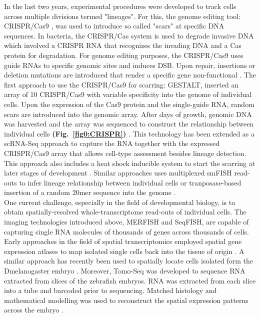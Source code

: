 In the last two years, experimental procedures were developed to track cells across multiple divisions termed "lineages". For this, the genome editing tool: \gls{CRISPR}/\gls{Cas9} \citep{Jinek2012}, was used to introduce so called "scars" at specific DNA sequences. In bacteria, the CRISPR/Cas system is used to degrade invasive DNA which involved a CRISPR RNA that recognizes the invading DNA and a Cas protein for degradation. For genome editing purposes, the \gls{CRISPR}/\gls{Cas9} uses guide RNAs to specific genomic sites and induces \gls{DSB}. Upon repair, insertions or deletion mutations are introduced that render a specific gene non-functional \citep{Zhang2014c}. The first approach to use the 	\gls{CRISPR}/\gls{Cas9} for scarring: \gls{GESTALT}, inserted an array of 10 \gls{CRISPR}/\gls{Cas9} with variable specificity into the genome of individual cells. Upon the expression of the Cas9 protein and the single-guide RNA, random scars are introduced into the genomic array. After days of growth, genomic DNA was harvested and the array was sequenced to construct the relationship between individual cells \textbf{(Fig.~\ref{fig0:CRISPR})} \citep{McKenna2016}. This technology has been extended as a scRNA-Seq approach to capture the RNA together with the expressed \gls{CRISPR}/\gls{Cas9} array that allows cell-type assessment besides lineage detection. This approach also includes a heat shock inducible system to start the scarring at later stages of development \citep{Raj2018}. Similar approaches uses multiplexed smFISH read-outs to infer lineage relationship between individual cells \citep{Frieda2017} or tranposase-based insertion of a random 20mer sequence into the genome \citep{Wagner2018}.\\

One current challenge, especially in the field of developmental biology, is to obtain spatially-resolved whole-transcriptome read-outs of individual cells. The imaging technologies introduced above, MERFISH and SeqFISH, are capable of capturing single RNA molecules of thousands of genes across thousands of cells. Early approaches in the field of spatial transcriptomics employed spatial gene expression atlases to map isolated single cells back into the tissue of origin \citep{Achim2015, Satija2015a}. A similar approach has recently been used to spatially locate cells isolated form the \gls{Dmelanogaster} embryo \citep{Karaiskos2017}. Moreover, Tomo-Seq was developed to sequence RNA extracted from slices of the zebrafish embryos. RNA was extracted from each slice into a tube and barcoded prior to sequencing. Matched histology and mathematical modelling was used to reconstruct the spatial expression patterns across the embryo \citep{Junker2014a}.

